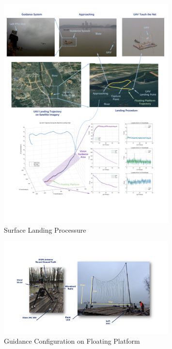 \begin{figure}[!t]
	\centering
	\includegraphics[width=0.8\textwidth]{Figs/chp08_21_river_landing.pdf}	
	\caption{Surface Landing Processure}
	\label{fig:chp08_21_river_landing}
\end{figure}


\begin{figure}[!ht]
	\centering
	\includegraphics[width=0.8\textwidth]{Figs/chp08_16_ship_ptus.pdf}	
	\caption{Guidance Configuration on Floating Platform}
	\label{fig:chp08_16_ship_ptus}
\end{figure}



